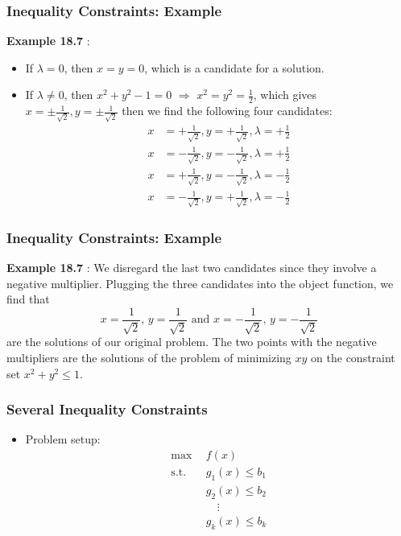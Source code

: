 \documentclass[9pt,aspectratio=169]{beamer}
\begin{document}
\begin{frame}
	\frametitle{Inequality Constraints: Example}
	\textbf{Example 18.7} : 
\begin{itemize}
\item If $\lambda = 0$, then $x = y = 0$, which is a candidate for
a solution. 
\item If $\lambda \neq 0$, then $x^2+y^2-1 = 0$ $\Rightarrow $ $x^2 = y^2 =
\frac{1}{2}$, which gives $x = \pm \frac{1}{\sqrt{2}}, y = \pm
\frac{1}{\sqrt{2}}$ then we find the following four candidates: \small
\begin{align}
x & = +\frac{1}{\sqrt{2}}, y = +\frac{1}{\sqrt{2}}, \lambda = +\frac{1}{2} \nonumber \\
x & = -\frac{1}{\sqrt{2}}, y = -\frac{1}{\sqrt{2}}, \lambda = +\frac{1}{2} \nonumber \\
x & = +\frac{1}{\sqrt{2}}, y = -\frac{1}{\sqrt{2}}, \lambda = -\frac{1}{2} \nonumber \\
x & = -\frac{1}{\sqrt{2}}, y = +\frac{1}{\sqrt{2}}, \lambda = -\frac{1}{2} \nonumber 
\end{align} 
\end{itemize}
\end{frame}	

\begin{frame}
	\frametitle{Inequality Constraints: Example} \textbf{Example 18.7} : We
    disregard the last two candidates since they involve a negative
    multiplier. Plugging the three candidates into the object function, we
    find that
	$$x = \frac{1}{\sqrt{2}},\, y = \frac{1}{\sqrt{2}} \text{ and } x =
    -\frac{1}{\sqrt{2}},\, y = -\frac{1}{\sqrt{2}}$$
    are the solutions of our original problem. The two points with the
    negative multipliers are the solutions of the problem of minimizing $xy$
    on the constraint set $x^2+y^2\leq 1$.
\end{frame}




\begin{frame}
	\frametitle{Several Inequality Constraints}
\begin{itemize}
	\item Problem setup:
	\begin{align}
	\max \ \ &f(x) \nonumber \\
	\text{s.t.}\ \ &g_1(x) \leq b_1 \nonumber \\
    &g_2(x) \leq b_2 \nonumber \\
	 & \quad\vdots \nonumber \\
	& g_k(x) \leq b_k \nonumber
	\end{align}
\end{itemize}
\end{frame}
\end{document}
